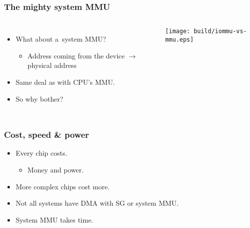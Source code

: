 \begin{frame}
  \frametitle{The mighty system MMU}

  \begin{columns}[c]

    \begin{itemize}
    \item What about a~system MMU?
      \begin{itemize}
      \item Address coming from the device $\rightarrow$ physical
        address
      \end{itemize}
    \item Same deal as with CPU's MMU.
    \item So why bother?
    \end{itemize}

    \begin{center}
      \texttt{[image: build/iommu-vs-mmu.eps]}
    \end{center}

  \end{columns}
\end{frame}

\begin{frame}
  \frametitle{Cost, speed \& power}

  \begin{itemize}
  \item Every chip costs.
    \begin{itemize}
    \item Money and power.
    \end{itemize}
  \item More complex chips cost more.
  \item Not all systems have DMA with SG or system MMU.
  \item System MMU takes time.
  \end{itemize}
\end{frame}
